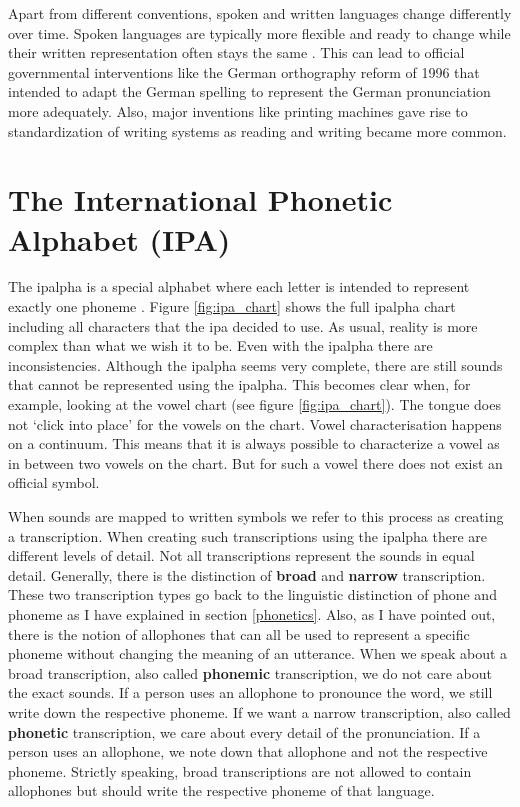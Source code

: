 Apart from different conventions, spoken and written languages change differently over time. Spoken languages are typically more flexible and ready to change while their written representation often stays the same \citep{unicode-lingu}. This can lead to official governmental interventions like the German orthography reform of 1996 that intended to adapt the German spelling to represent the German pronunciation more adequately. Also, major inventions like printing machines gave rise to standardization of writing systems as reading and writing became more common.

\section{The International Phonetic Alphabet (IPA)}
\label{sec:ipa}
The \ac{ipalpha} is a special alphabet where each letter is intended to represent exactly one phoneme \citep{Intro.2007}. Figure \ref{fig:ipa_chart} shows the full \ac{ipalpha} chart including all characters that the \ac{ipa} decided to use. As usual, reality is more complex than what we wish it to be. Even with the \ac{ipalpha} there are inconsistencies. Although the \ac{ipalpha} seems very complete, there are still sounds that cannot be represented using the \ac{ipalpha}. This becomes clear when, for example, looking at the vowel chart (see figure \ref{fig:ipa_chart}). The tongue does not `click into place' for the vowels on the chart. Vowel characterisation happens on a continuum. This means that it is always possible to characterize a vowel as in between two vowels on the chart. But for such a vowel there does not exist an official symbol.

When sounds are mapped to written symbols we refer to this process as creating a transcription. When creating such transcriptions using the \ac{ipalpha} there are different levels of detail. Not all transcriptions represent the sounds in equal detail. Generally, there is the distinction of \textbf{broad} and \textbf{narrow} transcription. These two transcription types go back to the linguistic distinction of phone and phoneme as I have explained in section \ref{phonetics}. Also, as I have pointed out, there is the notion of allophones that can all be used to represent a specific phoneme without changing the meaning of an utterance. When we speak about a broad transcription, also called \textbf{phonemic} transcription, we do not care about the exact sounds. If a person uses an allophone to pronounce the word, we still write down the respective phoneme. If we want a narrow transcription, also called \textbf{phonetic} transcription, we care about every detail of the pronunciation. If a person uses an allophone, we note down that allophone and not the respective phoneme. Strictly speaking, broad transcriptions are not allowed to contain allophones but should write the respective phoneme of that language. 

